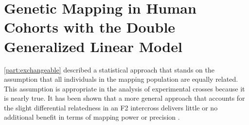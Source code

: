 \chapter{Genetic Mapping in Human Cohorts with the Double Generalized Linear Model}
\label{chap:dglm_human}

\cref{part:exchangeable} described a statistical approach that stands on the assumption that all individuals in the mapping population are equally related.
This assumption is appropriate in the analysis of experimental crosses because it is nearly true.
It has been shown that a more general approach that accounts for the slight differential relatedness in an F2 intercross delivers little or no additional benefit in terms of mapping power or precision \citep{Parker2014b}.
